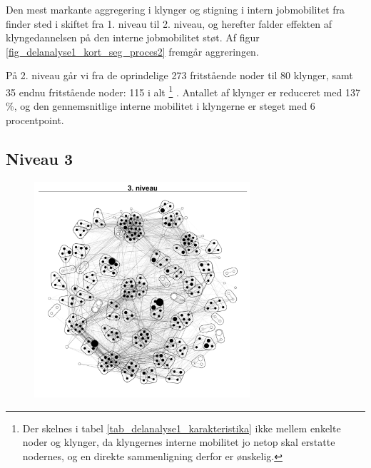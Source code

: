 Den mest markante aggregering i klynger og stigning i intern jobmobilitet fra finder sted i skiftet fra 1. niveau til 2. niveau, og herefter falder effekten af klyngedannelsen på den interne jobmobilitet støt. Af figur \ref{fig_delanalyse1_kort_seg_proces2} fremgår aggreringen. 

På 2. niveau går vi fra de oprindelige 273 fritstående noder til 80 klynger, samt 35 endnu fritstående noder: 115 i alt%
%
\footnote{ Der skelnes i tabel \ref{tab_delanalyse1_karakteristika} ikke mellem enkelte noder og klynger, da klyngernes interne mobilitet jo netop skal erstatte nodernes, og en direkte sammenligning derfor er ønskelig.}%
%
. Antallet af klynger er reduceret med 137 \%, og den gennemsnitlige interne mobilitet i klyngerne er steget med 6 procentpoint. 


\newpage \subsection{Niveau 3}

\begin{figure}
  \vspace{-20pt}
  \begin{center}
   \caption{}
   \label{fig_delanalyse1_kort_seg_proces3}
    \includegraphics[width=8cm]{fig/netvaerkskort/kort_seg_proces3.pdf}
    \label{fig_delanalyse1_kort_seg_proces3}
  \end{center}
  \vspace{-20pt}
\end{figure}

